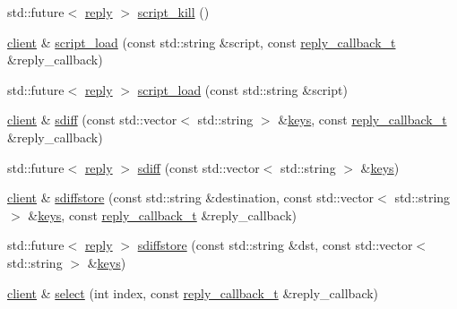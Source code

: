 \begin{DoxyCompactItemize}
std\+::future$<$ \hyperlink{classcpp__redis_1_1reply}{reply} $>$ \hyperlink{classcpp__redis_1_1client_a35286249f2405afa0cf412472c1067b4}{script\+\_\+kill} ()
\item 
\hyperlink{classcpp__redis_1_1client}{client} \& \hyperlink{classcpp__redis_1_1client_a1c1d1b3daff14dc29c32d1ea8407efdb}{script\+\_\+load} (const std\+::string \&script, const \hyperlink{classcpp__redis_1_1client_a061a1140d36d2eaeda82b09a0bb3f9f2}{reply\+\_\+callback\+\_\+t} \&reply\+\_\+callback)
\item 
std\+::future$<$ \hyperlink{classcpp__redis_1_1reply}{reply} $>$ \hyperlink{classcpp__redis_1_1client_a2c42d83c0bfcb46d41d2c205d808e6c8}{script\+\_\+load} (const std\+::string \&script)
\item 
\hyperlink{classcpp__redis_1_1client}{client} \& \hyperlink{classcpp__redis_1_1client_a9d70980e8fc5c90f218c5fd2215bed89}{sdiff} (const std\+::vector$<$ std\+::string $>$ \&\hyperlink{classcpp__redis_1_1client_acb7845a206b2321e6919c2f38282c322}{keys}, const \hyperlink{classcpp__redis_1_1client_a061a1140d36d2eaeda82b09a0bb3f9f2}{reply\+\_\+callback\+\_\+t} \&reply\+\_\+callback)
\item 
std\+::future$<$ \hyperlink{classcpp__redis_1_1reply}{reply} $>$ \hyperlink{classcpp__redis_1_1client_a93ff7c295d6147d3d452364533a19de9}{sdiff} (const std\+::vector$<$ std\+::string $>$ \&\hyperlink{classcpp__redis_1_1client_acb7845a206b2321e6919c2f38282c322}{keys})
\item 
\hyperlink{classcpp__redis_1_1client}{client} \& \hyperlink{classcpp__redis_1_1client_a0f896b36f3284d66bb1679f535378bf5}{sdiffstore} (const std\+::string \&destination, const std\+::vector$<$ std\+::string $>$ \&\hyperlink{classcpp__redis_1_1client_acb7845a206b2321e6919c2f38282c322}{keys}, const \hyperlink{classcpp__redis_1_1client_a061a1140d36d2eaeda82b09a0bb3f9f2}{reply\+\_\+callback\+\_\+t} \&reply\+\_\+callback)
\item 
std\+::future$<$ \hyperlink{classcpp__redis_1_1reply}{reply} $>$ \hyperlink{classcpp__redis_1_1client_afd4930fd767bbf14bae1f5ddfd8ee212}{sdiffstore} (const std\+::string \&dst, const std\+::vector$<$ std\+::string $>$ \&\hyperlink{classcpp__redis_1_1client_acb7845a206b2321e6919c2f38282c322}{keys})
\item 
\hyperlink{classcpp__redis_1_1client}{client} \& \hyperlink{classcpp__redis_1_1client_aee37b9bd265b8db614b4d7dcfdbaa422}{select} (int index, const \hyperlink{classcpp__redis_1_1client_a061a1140d36d2eaeda82b09a0bb3f9f2}{reply\+\_\+callback\+\_\+t} \&reply\+\_\+callback)

\end{DoxyCompactItemize}
